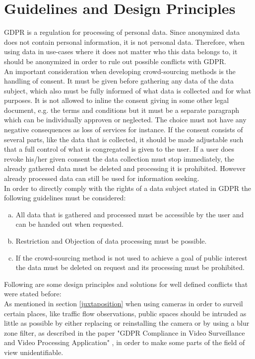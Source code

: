 \documentclass[a4paper,12pt]{report}
\begin{document}
	\section{Guidelines and Design Principles}
	\startsection
		GDPR is a regulation for processing of personal data. Since anonymized data does not contain personal information, it is not personal data. Therefore, when using data in use-cases where it does not matter who this data belongs to, it should be anonymized in order to rule out possible conflicts with GDPR. \\
		An important consideration when developing crowd-sourcing methods is the handling of consent. It must be given before gathering any data of the data subject, which also must be fully informed of what data is collected and for what purposes. It is not allowed to inline the consent giving in some other legal document, e.g. the terms and conditions but it must be a separate paragraph which can be individually approven or neglected. The choice must not have any negative consequences as loss of services for instance. If the consent consists of several parts, like the data that is collected, it should be made adjustable such that a full control of what is congregated is given to the user. If a user does revoke his/her given consent the data collection must stop immediately, the already gathered data must be deleted and processing it is prohibited. However already processed data can still be used for information seeking. \\
		In order to directly comply with the rights of a data subject stated in GDPR the following guidelines must be considered:
		\begin{enumerate}[(a)]
			\item All data that is gathered and processed must be accessible by the user and can be handed out when requested.
			\item Restriction and Objection of data processing must be possible.
			\item If the crowd-sourcing method is not used to achieve a goal of public interest the data must be deleted on request and its processing must be prohibited.
		\end{enumerate}
		Following are some design principles and solutions for well defined conflicts that were stated before: \\	
		As mentioned in section \ref{juxtaposition} when using cameras in order to surveil certain places, like traffic flow observations, public spaces should be intruded as little as possible by either replacing or reinstalling the camera or by using a blur zone filter, as described in the paper "GDPR Compliance in Video Surveillance and Video Processing Application" \cite{GDPRandSurveillanceCameras}, in order to make some parts of the field of view unidentifiable. \\
\end{document}
